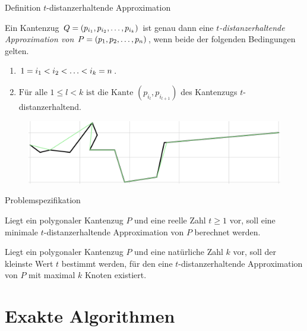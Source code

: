 \documentclass{beamer}
\begin{document}
	\begin{frame}{Definition $t$-distanzerhaltende Approximation}
		\begin{definition}
			Ein Kantenzug $Q = (p_{i_1}, p_{i_2}, \mathellipsis, p_{i_k})$ ist genau dann eine \emph{$t$-distanzerhaltende Approximation von $P = (p_1, p_2, \mathellipsis, p_n)$}, wenn beide der folgenden Bedingungen gelten.
			\begin{enumerate}
				\item $\displaystyle 1 = i_1 < i_2 < \mathellipsis < i_k = n$.
				\item $\displaystyle \text{Für alle } 1 \leq l < k \text{ ist die Kante } (p_{i_l}, p_{i_{l+1}})$ des Kantenzugs $t$-distanzerhaltend.
			\end{enumerate}
		\end{definition}
	\begin{figure}
		\includegraphics[width=\textwidth]{approximation_example.png}
	\end{figure}
	\end{frame}
	
	\begin{frame}{Problemspezifikation}
		\begin{definition}
			Liegt ein polygonaler Kantenzug $P$ und eine reelle Zahl $t \geq 1$ vor, soll eine minimale $t$-distanzerhaltende Approximation von $P$ berechnet werden.
		\end{definition}
		\begin{definition}
			Liegt ein polygonaler Kantenzug $P$ und eine natürliche Zahl $k$ vor, soll der kleinste Wert $t$ bestimmt werden, für den eine $t$-distanzerhaltende Approximation von $P$ mit maximal $k$ Knoten existiert.
		\end{definition}

	\end{frame}
	
	\section{Exakte Algorithmen}
\end{document}
